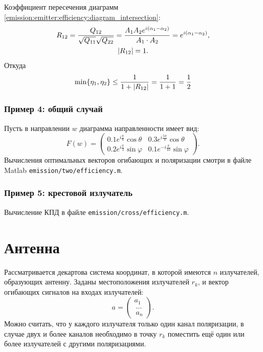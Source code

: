 Коэффициент пересечения диаграмм \eqref{emission:emitter:efficiency:diagram_intersection}:
\begin{gather*}
    R_{12}
    = \frac{Q_{12}}{\sqrt{Q_{11}} \sqrt{Q_{22}}}
    = \frac{A_1 A_2 e^{i(\alpha_1 - \alpha_2)}}{A_1 \cdot A_2}
    = e^{i(\alpha_1 - \alpha_2)}, \\
    \left | R_{12} \right | = 1 .
\end{gather*}
Откуда
\[
    \min \{ \eta_1, \eta_2 \} \le \frac{1}{1 + \left | R_{12} \right |} = \frac{1}{1+1} = \frac{1}{2}
\]

\subsubsection{Пример 4: общий случай}

Пусть в направлении $w$ диаграмма направленности имеет вид:
\[
    F(w)
    =
    \begin{pmatrix}
        0.1 e^{i \frac{\pi}{6}} \cos \theta  & 0.3 e^{i \frac{5 \pi}{4}} \cos \theta   \\
        0.2 e^{i \frac{\pi}{3}} \sin \varphi & 0.1 e^{- i \frac{\pi}{10}} \sin \varphi
    \end{pmatrix} .
\]
Вычисления оптимальных векторов огибающих и поляризации смотри в файле Matlab \texttt{emission/two/efficiency.m}.

\subsubsection{Пример 5: крестовой излучатель}

Вычисление КПД в файле \texttt{emission/cross/efficiency.m}.

\section{Антенна}

Рассматривается декартова система координат, в которой имеются $n$ излучателей, образующих антенну. Заданы местоположения излучателей $r_k$, и вектор огибающих
сигналов на входах излучателей:
\[
    a
    = \begin{pmatrix}
          a_1   \\\
          \dots \\\
          a_n
    \end{pmatrix} .
\]
Можно считать, что у каждого излучателя только один канал поляризации, в случае двух и более каналов необходимо в точку $r_k$ поместить ещё один или более
излучателей с другими поляризациями.

